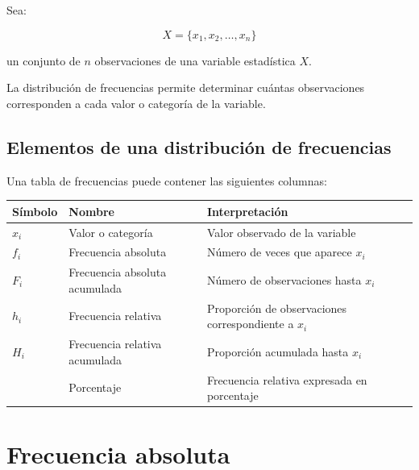\documentclass[
  spanish,
  14pt,
  letterpaper,
  DIV=11,
  numbers=noendperiod]{scrartcl}
\newcounter{none} %
\begin{document}
Sea:

\[
X=\{x_1,x_2,\ldots,x_n\}
\]

un conjunto de \(n\) observaciones de una variable estadística \(X\).

La distribución de frecuencias permite determinar cuántas observaciones
corresponden a cada valor o categoría de la variable.

\subsection{Elementos de una distribución de
frecuencias}\label{elementos-de-una-distribuciuxf3n-de-frecuencias}

Una tabla de frecuencias puede contener las siguientes columnas:

{\def\LTcaptype{none} %
\begin{longtable}[]{@{}
  >{\centering\arraybackslash}p{}
  >{\raggedright\arraybackslash}p{}
  >{\raggedright\arraybackslash}p{}@{}}
\toprule\noalign{}
\begin{minipage}[b]{\linewidth}\centering
Símbolo
\end{minipage} & \begin{minipage}[b]{\linewidth}\raggedright
Nombre
\end{minipage} & \begin{minipage}[b]{\linewidth}\raggedright
Interpretación
\end{minipage} \\
\midrule\noalign{}
\endhead
\bottomrule\noalign{}
\endlastfoot
\(x_i\) & Valor o categoría & Valor observado de la variable \\
\(f_i\) & Frecuencia absoluta & Número de veces que aparece \(x_i\) \\
\(F_i\) & Frecuencia absoluta acumulada & Número de observaciones hasta
\(x_i\) \\
\(h_i\) & Frecuencia relativa & Proporción de observaciones
correspondiente a \(x_i\) \\
\(H_i\) & Frecuencia relativa acumulada & Proporción acumulada hasta
\(x_i\) \\
\(%
\) & Porcentaje & Frecuencia relativa expresada en porcentaje \\
\end{longtable}
}

\section{Frecuencia absoluta}\label{frecuencia-absoluta}
\end{document}
